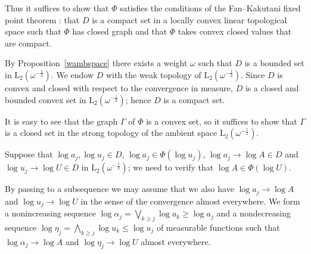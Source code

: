 \documentclass[12pt]{amsart}
\newcommand {\lclass} [2] {\ensuremath{\mathrm L_{#1} \left( #2 \right) }}
\newcommand {\weightu} {\ensuremath {\mathit u}}
\begin{document}
Thus it suffices to show that $\Phi$ satisfies the conditions of the Fan--Kakutani fixed point theorem
\cite {fanky1952}: that $D$ is a compact set in a locally convex linear topological space such that
$\Phi$ has closed graph and that $\Phi$ takes convex closed values that are compact.

By Proposition~\ref {wambspace} there exists a weight $\omega$ such that
$D$ is a bounded set in $\lclass {2} {\omega^{-\frac 1 2}}$.  We endow $D$ with the weak topology
of $\lclass {2} {\omega^{-\frac 1 2}}$.
Since $D$ is convex and closed with respect to the convergence in measure,
$D$ is a closed and bounded convex set in $\lclass {2} {\omega^{-\frac 1 2}}$; hence
$D$ is a compact set.

It is easy to see that the graph $\Gamma$
of $\Phi$ is a convex set, so it suffices to show that $\Gamma$ is a closed set in the strong topology
of the ambient space $\lclass {2} {\omega^{-\frac 1 2}}$.

Suppose that $\log a_j, \log \weightu_j \in D$, $\log a_j \in \Phi (\log u_j)$,
$\log a_j \to \log A \in D$ and $\log \weightu_j \to \log U \in D$ in $\lclass {2} {\omega^{-\frac 1 2}}$;
we need to verify that $\log A \in \Phi (\log U)$.

By passing to a subsequence we may assume that we also have $\log a_j \to \log A$ and $\log \weightu_j \to \log U$
in the sense of the convergence almost everywhere.
We form
a nonincreasing sequence $\log \alpha_j = \bigvee_{k \geqslant j} \log a_k \geqslant \log a_j$
and a nondecreasing sequence $\log \eta_j = \bigwedge_{k \geqslant j} \log \weightu_k \leqslant \log \weightu_j$
of measurable functions
such that $\log \alpha_j \to \log A$ and $\log \eta_j \to \log U$ almost everywhere.
\end{document}
